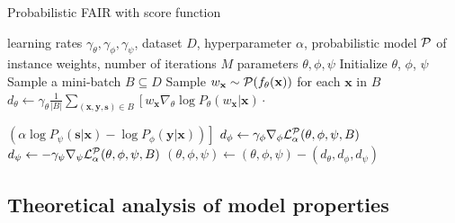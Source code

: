 \documentclass[preprint,12pt]{elsarticle}
\begin{document}
\begin{algorithm}
	\caption{Probabilistic FAIR with score function}
	\label{alg:FAIR-sf}
	\begin{algorithmic}
		 learning rates $\gamma_\theta, \gamma_\phi, \gamma_\psi$, dataset $D$,  hyperparameter $\alpha$, probabilistic model ${\cal P}$ of instance weights, number of iterations $M$
		 parameters $\theta,\phi,\psi$
		\vspace{2mm}
		\State Initialize $\theta$, $\phi$, $\psi$
		\State Sample a mini-batch $B\subseteq D$
		\State Sample $w_\mathbf{x}\sim {\cal P}(f_\theta(\mathbf{x}))$ for each $\mathbf{x}$ in $B$
		\State $d_{\theta} \leftarrow \gamma_\theta\frac{1}{|B|} \sum_{(\mathbf{x},\mathbf{y},\mathbf{s})\in B}\left[w_\mathbf{x}\nabla_{\theta}\log P_\theta(w_\mathbf{x}|\mathbf{x})\cdot\right.$
		
		\hspace{3cm}$\left.(\alpha\log P_\psi(\mathbf{s}|\mathbf{x})-\log P_\phi(\mathbf{y}|\mathbf{x}))\right]$
		\State $d_{\phi} \leftarrow \gamma_\phi\nabla_{\phi}{\cal L}^{\cal P}_\alpha(\theta,\phi,\psi,B)$
		\State $d_{\psi} \leftarrow -\gamma_\psi\nabla_{\psi}{\cal L}^{\cal P}_\alpha(\theta,\phi,\psi,B)$
		\State $(\theta,\phi,\psi) \leftarrow (\theta,\phi,\psi) - (d_{\theta}, d_{\phi}, d_{\psi})$
		\EndFor
	\end{algorithmic}
\end{algorithm}



\subsection{Theoretical analysis of model properties}
\end{document}
